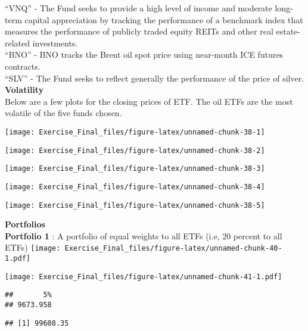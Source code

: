 \documentclass[
]{article}
\begin{document}
``VNQ'' - The Fund seeks to provide a high level of income and moderate
long-term capital appreciation by tracking the performance of a
benchmark index that measures the performance of publicly traded equity
REITs and other real estate-related investments.\\

``BNO'' - BNO tracks the Brent oil spot price using near-month ICE
futures contracts.\\

``SLV'' - The Fund seeks to reflect generally the performance of the
price of silver.\\

\textbf{Volatility}\\
Below are a few plots for the closing prices of ETF. The oil ETFs are
the most volatile of the five funds chosen.

\begin{center}\texttt{[image: Exercise\_Final\_files/figure-latex/unnamed-chunk-38-1]} \end{center}

\begin{center}\texttt{[image: Exercise\_Final\_files/figure-latex/unnamed-chunk-38-2]} \end{center}

\begin{center}\texttt{[image: Exercise\_Final\_files/figure-latex/unnamed-chunk-38-3]} \end{center}

\begin{center}\texttt{[image: Exercise\_Final\_files/figure-latex/unnamed-chunk-38-4]} \end{center}

\begin{center}\texttt{[image: Exercise\_Final\_files/figure-latex/unnamed-chunk-38-5]} \end{center}

\textbf{Portfolios}\\
\textbf{Portfolio 1} : A portfolio of equal weights to all ETFs (i.e, 20
percent to all ETFs)
\texttt{[image: Exercise\_Final\_files/figure-latex/unnamed-chunk-40-1.pdf]}

\texttt{[image: Exercise\_Final\_files/figure-latex/unnamed-chunk-41-1.pdf]}

\begin{verbatim}
##       5% 
## 9673.958
\end{verbatim}

\begin{verbatim}
## [1] 99608.35
\end{verbatim}
\end{document}
